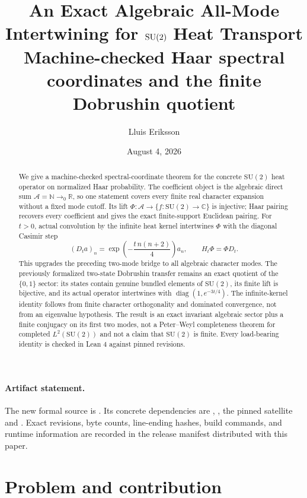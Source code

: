 \documentclass[11pt]{article}
\title{An Exact Algebraic All-Mode Intertwining for $\SU$ Heat Transport\\
\large Machine-checked Haar spectral coordinates and the finite Dobrushin quotient}
\author{Lluis Eriksson}
\date{August 4, 2026}
\theoremstyle{definition}
\theoremstyle{remark}
\newcommand{\SU}{\mathrm{SU}(2)}
\begin{document}
\maketitle

\begin{abstract}
We give a machine-checked spectral-coordinate theorem for the concrete
$\SU$ heat operator on normalized Haar probability.  The coefficient object
is the algebraic direct sum $\mathcal A=\mathbb N\to_0\mathbb R$, so one
statement covers every finite real character expansion without a fixed mode
cutoff.  Its lift $\Phi:\mathcal A\to\{f:\SU\to\mathbb C\}$ is injective;
Haar pairing recovers every coefficient and gives the exact finite-support
Euclidean pairing.  For $t>0$, actual convolution by the infinite heat kernel
intertwines $\Phi$ with the diagonal Casimir step
\[
 (D_ta)_n=\exp\!\left(-\frac{t\,n(n+2)}4\right)a_n,
 \qquad H_t\Phi=\Phi D_t.
\]
This upgrades the preceding two-mode bridge to all algebraic character modes.
The previously formalized two-state Dobrushin transfer remains an exact
quotient of the $\{0,1\}$ sector: its states contain genuine bundled elements
of $\SU$, its finite lift is bijective, and its actual operator intertwines
with $\operatorname{diag}(1,e^{-3t/4})$.  The infinite-kernel identity follows
from finite character orthogonality and dominated convergence, not from an
eigenvalue hypothesis.  The result is an exact invariant algebraic sector
plus a finite conjugacy on its first two modes, not a Peter--Weyl completeness
theorem for completed $L^2(\SU)$ and not a claim that $\SU$ is finite.  Every
load-bearing identity is checked in Lean 4 against pinned revisions.
\end{abstract}

\paragraph{Artifact statement.}
The new formal source is
.  Its concrete dependencies are
,
, the pinned satellite and
.  Exact revisions, byte counts, line-ending
hashes, build commands, and runtime information are recorded in the release
manifest distributed with this paper.

\section{Problem and contribution}
\end{document}
